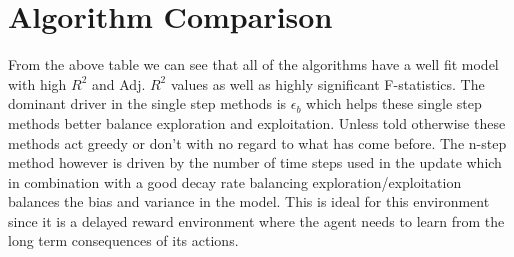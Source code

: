\documentclass{article}
\begin{document}
\section{Algorithm Comparison}
\begin{table}[htbp]
\centering
\caption{Executive Summary: Model Fit and Dominant Parameter Effects Across Architectures}
\label{tab:executive_summary_stats}
\end{table}
From the above table we can see that all of the algorithms have a well fit model with high $R^2$ and Adj. $R^2$ values as well as highly significant F-statistics. The dominant driver in the single step methods is $\epsilon_b$ which helps these single step methods better balance exploration and exploitation. Unless told otherwise these methods act greedy or don't with no regard to what has come before. The n-step method however is driven by the number of time steps used in the update which in combination with a good decay rate balancing exploration/exploitation balances the bias and variance in the model. This is ideal for this environment since it is a delayed reward environment where the agent needs to learn from the long term consequences of its actions.
\end{document}
